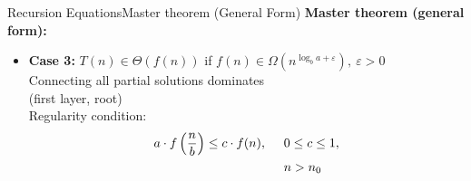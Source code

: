 \begin{frame}{Recursion Equations}{Master theorem (General Form)}
  \textbf{Master theorem (general form):}
  \begin{itemize}
    \item<2->
      \textbf{Case 3:}
      {\color{Mittel-Gruen}$T(n) \in \Theta(f(n))$}
      \hfill if {\color{Mittel-Blau}
        $f(n) \in \Omega(n^{\log_b a+\varepsilon}), ~ \varepsilon > 0$
      }\\
      {\color{gray}Connecting all partial solutions dominates\\
        (first layer, root)}\\[1.0em]
      {\color{Mittel-Blau}Regularity condition:}
      \begin{align*}
        a \cdot f\left(\frac{n}{b}\right) \leq c \cdot f(n), \hspace{1.5em} &
        0 \leq c \leq 1,\\
        {} & n > n_0
      \end{align*}
  \end{itemize}
\end{frame}


